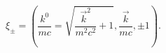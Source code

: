 \begin{equation}
\xi_{\pm}=\left(\frac{k^0}{mc}=\sqrt{\frac{\vec
k^2}{m^2c^2}+1},\frac{\vec k}{mc},\pm 1\right).
\end{equation}


